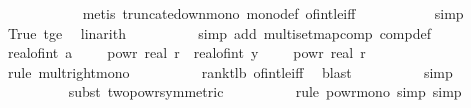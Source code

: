 \begin{isabellebody}
\ \ \ \ \ \ \ \ \ \ \isamarkupfalse%
\ {\isacharparenleft}{\kern0pt}metis\ truncate{\isacharunderscore}{\kern0pt}down{\isacharunderscore}{\kern0pt}mono\ mono{\isacharunderscore}{\kern0pt}def\ of{\isacharunderscore}{\kern0pt}int{\isacharunderscore}{\kern0pt}le{\isacharunderscore}{\kern0pt}iff{\isacharparenright}{\kern0pt}\isanewline
\ \ \ \ \ \ \ \ \ \isamarkupfalse%
\ simp\ \isamarkupfalse%
\ True\ t{\isacharunderscore}{\kern0pt}ge{\isacharunderscore}{\kern0pt}{}\ \isamarkupfalse%
\ linarith\isanewline
\ \ \ \ \ \ \ \ \isamarkupfalse%
\ {\isacharparenleft}{\kern0pt}simp\ add{\isacharcolon}{\kern0pt}\ multiset{\isachardot}{\kern0pt}map{\isacharunderscore}{\kern0pt}comp\ comp{\isacharunderscore}{\kern0pt}def{\isacharparenright}{\kern0pt}\isanewline
\ \ \ \ \ \ \isamarkupfalse%
\ {\isachardoublequoteopen}real{\isacharunderscore}{\kern0pt}of{\isacharunderscore}{\kern0pt}int\ {\isacharparenleft}{\kern0pt}a{\isacharplus}{\kern0pt}{}{\isacharparenright}{\kern0pt}\ {\isacharasterisk}{\kern0pt}\ {\isacharparenleft}{\kern0pt}{}\ {\isacharminus}{\kern0pt}\ {}\ powr\ {\isacharminus}{\kern0pt}real\ r{\isacharparenright}{\kern0pt}\ {\isasymle}\ real{\isacharunderscore}{\kern0pt}of{\isacharunderscore}{\kern0pt}int\ y\ {\isacharasterisk}{\kern0pt}\ {\isacharparenleft}{\kern0pt}{}\ {\isacharminus}{\kern0pt}\ {}\ powr\ {\isacharparenleft}{\kern0pt}{\isacharminus}{\kern0pt}real\ r{\isacharparenright}{\kern0pt}{\isacharparenright}{\kern0pt}{\isachardoublequoteclose}\isanewline
\ \ \ \ \ \ \ \ \isamarkupfalse%
\ {\isacharparenleft}{\kern0pt}rule\ mult{\isacharunderscore}{\kern0pt}right{\isacharunderscore}{\kern0pt}mono{\isacharparenright}{\kern0pt}\isanewline
\ \ \ \ \ \ \ \ \isamarkupfalse%
\ rank{\isacharunderscore}{\kern0pt}t{\isacharunderscore}{\kern0pt}lb\ of{\isacharunderscore}{\kern0pt}int{\isacharunderscore}{\kern0pt}le{\isacharunderscore}{\kern0pt}iff\ \isamarkupfalse%
\ blast\isanewline
\ \ \ \ \ \ \ \ \isamarkupfalse%
\ simp\isanewline
\ \ \ \ \ \ \ \ \isamarkupfalse%
\ {\isacharparenleft}{\kern0pt}subst\ two{\isacharunderscore}{\kern0pt}powr{\isacharunderscore}{\kern0pt}{}{\isacharbrackleft}{\kern0pt}symmetric{\isacharbrackright}{\kern0pt}{\isacharparenright}{\kern0pt}\isanewline
\ \ \ \ \ \ \ \ \isamarkupfalse%
\ {\isacharparenleft}{\kern0pt}rule\ powr{\isacharunderscore}{\kern0pt}mono{\isacharcomma}{\kern0pt}\ simp{\isacharcomma}{\kern0pt}\ simp{\isacharparenright}{\kern0pt}\isanewline

\end{isabellebody}
